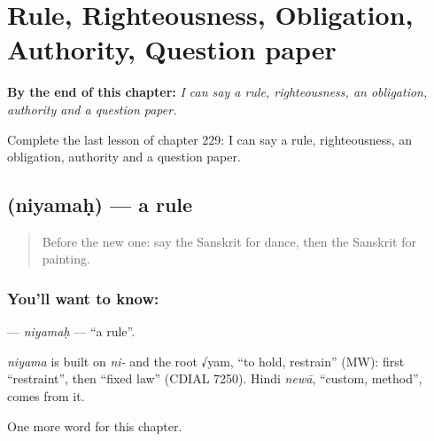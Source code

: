 
\chapter{Rule, Righteousness, Obligation, Authority, Question paper}
\label{ch:sa-rule-righteousness-obligation-authority-question-paper}

\begin{chapteropening}
\textbf{By the end of this chapter:} \emph{I can say a rule, righteousness, an obligation, authority and a question paper.}

Complete the last lesson of chapter 229: I can say a rule, righteousness, an obligation, authority and a question paper.
\end{chapteropening}

\section[\texorpdfstring{\sk{नियमः} (niyamaḥ)}{नियमः (niyamaḥ)}]{ (niyamaḥ) — a rule}

\label{lesson:SA-C229-niyamah}



\begin{quote}
Before the new one: say the Sanskrit for dance, then the Sanskrit for painting.
\end{quote}

\subsection*{You'll want to know: }
\textbf{} — \emph{niyamaḥ} — \textquotedblleft{}a rule\textquotedblright{}.

\begin{cousinweb}
\emph{niyama} is built on \emph{ni-} and the root √yam, \textquotedblleft{}to hold, restrain\textquotedblright{} (MW): first \textquotedblleft{}restraint\textquotedblright{}, then \textquotedblleft{}fixed law\textquotedblright{} (CDIAL 7250). Hindi \emph{newā}, \textquotedblleft{}custom, method\textquotedblright{}, comes from it.
\end{cousinweb}

\begin{grammarlens}[title={What you've built}]
One more word for this chapter.
\end{grammarlens}

